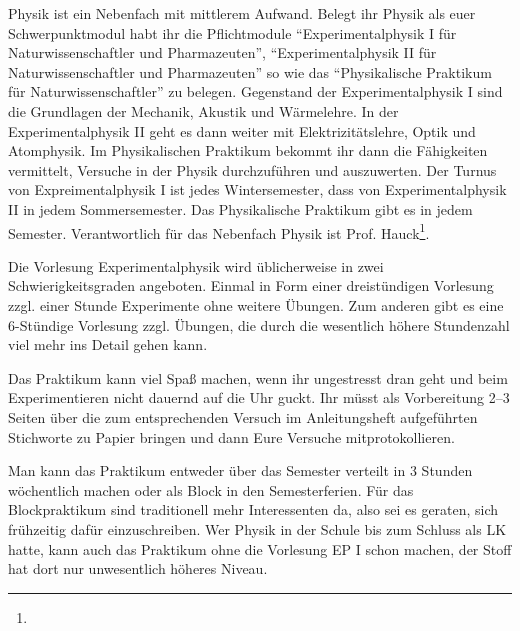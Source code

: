 Physik ist ein Nebenfach mit mittlerem Aufwand. 
Belegt ihr Physik als euer Schwerpunktmodul habt ihr die Pflichtmodule "`Experimentalphysik I für Naturwissenschaftler und Pharmazeuten"', "`Experimentalphysik II für Naturwissenschaftler und Pharmazeuten"' so wie das "`Physikalische Praktikum für Naturwissenschaftler"' zu belegen. Gegenstand der Experimentalphysik I sind die Grundlagen der Mechanik, Akustik und Wärmelehre. In der Experimentalphysik II geht es dann weiter mit Elektrizitätslehre, Optik und Atomphysik. Im Physikalischen Praktikum bekommt ihr dann die Fähigkeiten vermittelt, Versuche in der Physik durchzuführen und auszuwerten. Der Turnus von Expreimentalphysik I ist jedes Wintersemester, dass von Experimentalphysik II in jedem Sommersemester. Das Physikalische Praktikum gibt es in jedem Semester.
Verantwortlich für das Nebenfach Physik ist Prof. Hauck\footnote{}.


Die Vorlesung Ex\-pe\-ri\-men\-tal\-phy\-sik wird üblicherweise in zwei
  Schwierig\-keits\-graden angeboten. Einmal in Form einer dreistündigen
  Vorlesung zzgl. einer Stunde Experimente ohne weitere Übungen. Zum
  anderen gibt es eine 6-Stündige Vorlesung zzgl. Übungen, die durch die
  wesentlich höhere Stundenzahl viel mehr ins Detail gehen kann.

Das Praktikum kann viel Spaß machen, wenn ihr ungestresst dran geht
  und beim Experimen\-tieren nicht dauernd auf die Uhr guckt.  Ihr müsst
  als Vorbereitung 2--3 Seiten über die zum entsprechenden Versuch
  im Anleitungsheft aufgeführten Stichworte zu Papier bringen und dann
  Eure Versuche mitprotokollieren.

Man kann das Praktikum entweder über das Semester verteilt in 3 Stunden
  wöchentlich machen oder als Block in den Semesterferien. Für das
  Blockpraktikum sind traditionell mehr Interessenten da, also sei es
  geraten, sich frühzeitig dafür einzuschreiben.
  Wer Physik in der Schule bis zum Schluss als LK hatte, kann auch das Praktikum
  ohne die Vorlesung EP I schon machen, der Stoff hat dort nur unwesentlich
  höheres Niveau.
